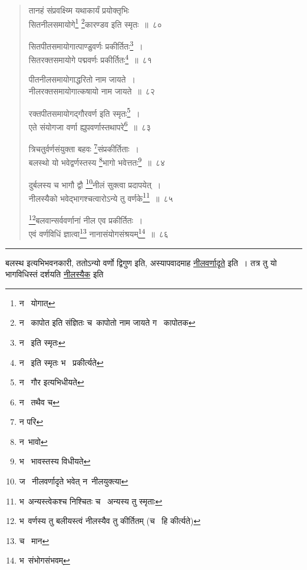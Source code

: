 \documentclass[11pt, openany]{book}
\begin{document}

\newpage
\lfoot{}

\begin{quote}
{\na तानहं संप्रवक्ष्य्मि यथाकार्यं प्रयोक्तृभिः\\
सितनीलसमायोगे\renewcommand{\thefootnote}{1}\footnote{न \textendash\ योगात्} \renewcommand{\thefootnote}{2}\footnote{न \textendash\ कापोत इति संज्ञितः च\textendash\ कापोतो नाम जायते ग \textendash\ कापोतक}कारण्डव इति स्मृतः~॥~८०

सितपीतसमायोगात्पाण्डुवर्णः प्रकीर्तितः\renewcommand{\thefootnote}{3}\footnote{न \textendash\ इति स्मृतः}~।\\
सितरक्तसमायोगे पद्मवर्णः प्रकीर्तितः\renewcommand{\thefootnote}{4}\footnote{न \textendash\ इति स्मृतः भ \textendash\ प्रकीर्त्यते}~॥~८१

पीतनीलसमायोगाद्धरितो नाम जायते~।\\
नीलरक्तसमायोगात्कषायो नाम जायते~॥~८२

रक्तपीतसमायोगद्गौरवर्ण इति स्मृतः\renewcommand{\thefootnote}{5}\footnote{न \textendash\ गौर इत्यभिधीयते}~।\\
एते संयोगजा वर्णा ह्युपवर्णास्तथापरे\renewcommand{\thefootnote}{6}\footnote{न \textendash\ तथैव च}~॥~८३

त्रिचतुर्वर्णसंयुक्ता बहवः \renewcommand{\thefootnote}{7}\footnote{न परि}संप्रकीर्तिताः~।\\
बलस्थो यो भवेद्वर्णस्तस्य \renewcommand{\thefootnote}{8}\footnote{न\textendash\ भावो}भागो भवेत्ततः\renewcommand{\thefootnote}{9}\footnote{भ \textendash\ भावस्तस्य विधीयते}~॥~८४

दुर्बलस्य च भागौ द्वौ \renewcommand{\thefootnote}{10}\footnote{ज \textendash\ नीलवर्णादृते भवेत् न\textendash\ नीलयुक्त्या}नीलं सुक्त्वा प्रदापयेत्~।\\
नीलस्यैको भवेद्भागश्चत्वारोऽन्ये तु वर्णके\renewcommand{\thefootnote}{11}\footnote{भ\textendash\ अन्यस्त्वेकश्च निश्चितः च \textendash\ अन्यस्य तु स्मृताः}~॥~८५

\renewcommand{\thefootnote}{12}\footnote{भ\textendash\ वर्णस्य तु बलीयस्त्वं नीलस्यैव तु कीर्तितम् (च \textendash\ हि कीर्त्यते)}बलवान्सर्ववर्णानां नील एव प्रकीर्तितः~।\\
एवं वर्णविधिं ज्ञात्वा\renewcommand{\thefootnote}{13}\footnote{च \textendash\ मान} नानासंयोगसंश्रयम्\renewcommand{\thefootnote}{14}\footnote{भ\textendash\ संभोगसंभवम्}~॥~८६}
\end{quote}

\hrule

\vspace{2mm}
बलस्थ इत्यभिभवनकारी, ततोऽन्यो वर्णो द्विगुण इति, अस्यापवादमाह \underline{नीलवर्णादृते} इति~। तत्र तु यो भागविधिस्तं दर्शयति \underline{नीलस्यैक} इति
\end{document}
